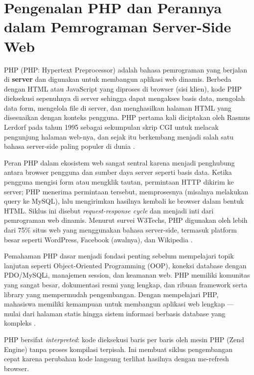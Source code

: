 ﻿\section{Pengenalan PHP dan Perannya dalam Pemrograman Server-Side Web}

PHP (PHP: Hypertext Preprocessor) adalah bahasa pemrograman yang berjalan di \textbf{server} dan digunakan untuk membangun aplikasi web dinamis. Berbeda dengan HTML atau JavaScript yang diproses di browser (sisi klien), kode PHP dieksekusi sepenuhnya di server sehingga dapat mengakses basis data, mengolah data form, mengelola file di server, dan menghasilkan halaman HTML yang disesuaikan dengan konteks pengguna. PHP pertama kali diciptakan oleh Rasmus Lerdorf pada tahun 1995 sebagai sekumpulan skrip CGI untuk melacak pengunjung halaman web-nya, dan sejak itu berkembang menjadi salah satu bahasa server-side paling populer di dunia \cite{phpManual}.

Peran PHP dalam ekosistem web sangat sentral karena menjadi penghubung antara browser pengguna dan sumber daya server seperti basis data. Ketika pengguna mengisi form atau mengklik tautan, permintaan HTTP dikirim ke server; PHP menerima permintaan tersebut, memprosesnya (misalnya melakukan query ke MySQL), lalu mengirimkan hasilnya kembali ke browser dalam bentuk HTML. Siklus ini disebut \textit{request-response cycle} dan menjadi inti dari pemrograman web dinamis. Menurut survei W3Techs, PHP digunakan oleh lebih dari 75\% situs web yang menggunakan bahasa server-side, termasuk platform besar seperti WordPress, Facebook (awalnya), dan Wikipedia \cite{w3schoolsPhp}.

Pemahaman PHP dasar menjadi fondasi penting sebelum mempelajari topik lanjutan seperti Object-Oriented Programming (OOP), koneksi database dengan PDO/MySQLi, manajemen session, dan keamanan web. PHP memiliki komunitas yang sangat besar, dokumentasi resmi yang lengkap, dan ribuan framework serta library yang mempermudah pengembangan. Dengan mempelajari PHP, mahasiswa memiliki kemampuan untuk membangun aplikasi web lengkap --- mulai dari halaman statis hingga sistem informasi berbasis database yang kompleks \cite{phpRightWay}.

\begin{catatan}
PHP bersifat \textit{interpreted}: kode dieksekusi baris per baris oleh mesin PHP (Zend Engine) tanpa proses kompilasi terpisah. Ini membuat siklus pengembangan cepat karena perubahan kode langsung terlihat hasilnya dengan me-refresh browser.
\end{catatan}

